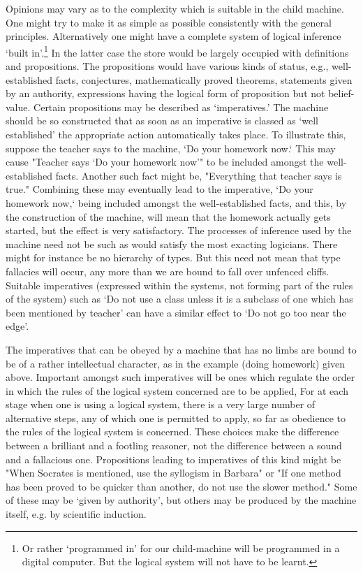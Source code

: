 \documentclass[10pt]{article} %
\begin{document}
Opinions may vary as to the complexity which is suitable in the child machine. One might try to make it as simple as possible consistently with the general principles. Alternatively one might have a complete system of logical inference `built in'.\footnote{\normalfont\tiny Or rather `programmed in' for our child-machine will be programmed in a digital computer. But the logical system will not have to be learnt.} In the latter case the store would be largely occupied with definitions and propositions. The propositions would have various kinds of status, e.g., well-established facts, conjectures, mathematically proved theorems, statements given by an authority, expressions having the logical form of proposition but not belief-value. Certain propositions may be described as `imperatives.' The machine should be so constructed that as soon as an imperative is classed as `well established' the appropriate action automatically takes place. To illustrate this, suppose the teacher says to the machine, `Do your homework now.` This may cause "Teacher says `Do your homework now'" to be included amongst the well-established facts. Another such fact might be, "Everything that teacher says is true." Combining these may eventually lead to the imperative, `Do your homework now,` being included amongst the well-established facts, and this, by the construction of the machine, will mean that the homework actually gets started, but the effect is very satisfactory. The processes of inference used by the machine need not be such as would satisfy the most exacting logicians. There might for instance be no hierarchy of types. But this need not mean that type fallacies will occur, any more than we are bound to fall over unfenced cliffs. Suitable imperatives (expressed within the systems, not forming part of the rules of the system) such as `Do not use a class unless it is a subclass of one which has been mentioned by teacher' can have a similar effect to `Do not go too near the edge'.

The imperatives that can be obeyed by a machine that has no limbs are bound to be of a rather intellectual character, as in the example (doing homework) given above. Important amongst such imperatives will be ones which regulate the order in which the rules of the logical system concerned are to be applied, For at each stage when one is using a logical system, there is a very large number of alternative steps, any of which one is permitted to apply, so far as obedience to the rules of the logical system is concerned. These choices make the difference between a brilliant and a footling reasoner, not the difference between a sound and a fallacious one. Propositions leading to imperatives of this kind might be "When Socrates is mentioned, use the syllogism in Barbara" or "If one method has been proved to be quicker than another, do not use the slower method." Some of these may be `given by authority', but others may be produced by the machine itself, e.g. by scientific induction.
\end{document}
